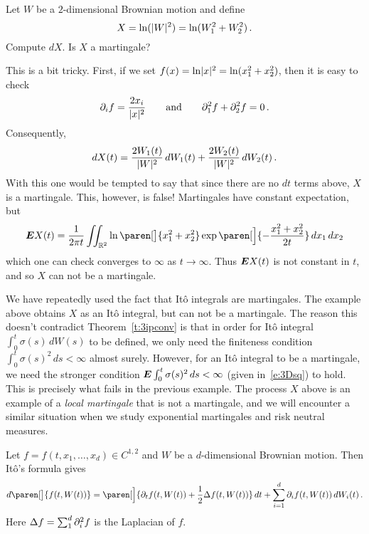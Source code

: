 \begin{example}
  Let $W$ be a $2$-dimensional Brownian motion and define
  \begin{equation*}
    X = \ln( \lvert W\rvert^2 ) = \ln (W_1^2 + W_2^2 )\,.
  \end{equation*} 
  Compute $dX$.
  Is $X$ a martingale?
\end{example}
\begin{sol}
  This is a bit tricky.
  First, if we set $f(x) = \ln \lvert x\rvert^2 = \ln( x_1^2 + x_2^2 )$, then it is easy to check
  \begin{equation*}
    \partial_i f = \frac{2 x_i}{\lvert x\rvert^2}
    \qquad\text{and}\qquad
    \partial_1^2 f + \partial_2^2 f = 0\,.
  \end{equation*}
  Consequently,
  \begin{equation*}
    dX(t)
      = \frac{2 W_1(t)}{\lvert W\rvert^2} \, dW_1(t)
	+ \frac{2 W_2(t)}{\lvert W\rvert^2} \, dW_2(t)\,.
  \end{equation*}
  With this one would be tempted to say that since there are no $dt$ terms above, $X$ is a martingale.
  This, however, is false!
  Martingales have constant expectation, but
  \begin{equation*}
    \E X(t) 
      = \frac{1}{2 \pi t} \iint_{\R^2}
	  \ln\paren[\big]{x_1^2 + x_2^2}
	  \exp\paren[\Big]{-\frac{x_1^2 + x_2^2}{2t}} \, dx_1 \, dx_2
  \end{equation*}
  which one can check converges to $\infty$ as $t \to \infty$.
  Thus $\bm{E} X(t)$ is not constant in $t$, and so $X$ can not be a martingale.
\end{sol}
\begin{remark}
  We have repeatedly used the fact that It\^o integrals are martingales.
  The example above obtains $X$ as an It\^o integral, but can not be a martingale.
  The reason this doesn't contradict Theorem~\ref{t:3ipconv} is that in order for It\^o integral $\int_0^t \sigma(s) \, dW(s)$ to be defined, we only need the finiteness condition $\int_0^t \sigma(s)^2 \, ds < \infty$ almost surely.
  However, for an It\^o integral to be a martingale, we need the stronger condition $\bm{E} \int_0^t \sigma(s)^2 \, ds < \infty$ (given in~\eqref{e:3Dsq}) to hold.
  This is precisely what fails in the previous example.
  The process $X$ above is an example of a \emph{local martingale} that is not a martingale, and we will encounter a similar situation when we study exponential martingales and risk neutral measures.
\end{remark}

\begin{example}
  Let $f = f(t, x_1, \dots, x_d) \in C^{1,2}$ and $W$ be a $d$-dimensional Brownian motion.
  Then It\^o's formula gives
  \begin{equation*}
    d\paren[\big]{ f(t, W(t)) }
      = \paren[\Big]{ \partial_t f( t, W(t)) + \frac{1}{2} \lap f( t, W(t) ) } \, dt
	+ \sum_{i=1}^d \partial_i f(t, W(t)) \, dW_i(t)\,.
  \end{equation*}
  Here $\Delta f = \sum_1^d \partial_i^2 f$ is the Laplacian of $f$.
\end{example}

